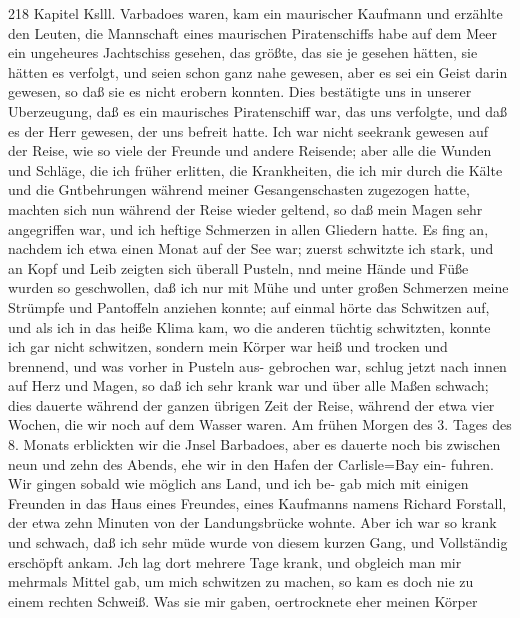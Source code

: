 218 Kapitel Kslll.
Varbadoes waren, kam ein maurischer Kaufmann und erzählte den
Leuten, die Mannschaft eines maurischen Piratenschiffs habe auf
dem Meer ein ungeheures Jachtschiss gesehen, das größte, das
sie je gesehen hätten, sie hätten es verfolgt, und seien schon ganz
nahe gewesen, aber es sei ein Geist darin gewesen, so daß sie es
nicht erobern konnten. Dies bestätigte uns in unserer Uberzeugung,
daß es ein maurisches Piratenschiff war, das uns verfolgte, und
daß es der Herr gewesen, der uns befreit hatte.
Ich war nicht seekrank gewesen auf der Reise, wie so viele
der Freunde und andere Reisende; aber alle die Wunden und
Schläge, die ich früher erlitten, die Krankheiten, die ich mir durch
die Kälte und die Gntbehrungen während meiner Gesangenschasten
zugezogen hatte, machten sich nun während der Reise wieder
geltend, so daß mein Magen sehr angegriffen war, und ich heftige
Schmerzen in allen Gliedern hatte. Es fing an, nachdem ich
etwa einen Monat auf der See war; zuerst schwitzte ich stark,
und an Kopf und Leib zeigten sich überall Pusteln, nnd meine
Hände und Füße wurden so geschwollen, daß ich nur mit Mühe
und unter großen Schmerzen meine Strümpfe und Pantoffeln
anziehen konnte; auf einmal hörte das Schwitzen auf, und
als ich in das heiße Klima kam, wo die anderen tüchtig schwitzten,
konnte ich gar nicht schwitzen, sondern mein Körper war heiß
und trocken und brennend, und was vorher in Pusteln aus-
gebrochen war, schlug jetzt nach innen auf Herz und Magen, so
daß ich sehr krank war und über alle Maßen schwach; dies
dauerte während der ganzen übrigen Zeit der Reise, während
der etwa vier Wochen, die wir noch auf dem Wasser waren.
Am frühen Morgen des 3. Tages des 8. Monats erblickten wir
die Jnsel Barbadoes, aber es dauerte noch bis zwischen neun und
zehn des Abends, ehe wir in den Hafen der Carlisle=Bay ein-
fuhren. Wir gingen sobald wie möglich ans Land, und ich be-
gab mich mit einigen Freunden in das Haus eines Freundes,
eines Kaufmanns namens Richard Forstall, der etwa zehn
Minuten von der Landungsbrücke wohnte. Aber ich war so
krank und schwach, daß ich sehr müde wurde von diesem kurzen
Gang, und Vollständig erschöpft ankam. Jch lag dort mehrere
Tage krank, und obgleich man mir mehrmals Mittel gab, um
mich schwitzen zu machen, so kam es doch nie zu einem rechten
Schweiß. Was sie mir gaben, oertrocknete eher meinen Körper


